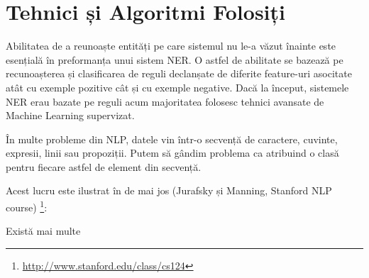 \chapter{Tehnici și Algoritmi Folosiți}

Abilitatea de a reunoaște entități pe care sistemul nu le-a văzut înainte este esențială în preformanța unui sistem NER. O astfel de abilitate se bazează pe recunoașterea și clasificarea de reguli declanșate de diferite feature-uri asocitate atât cu exemple pozitive cât și cu exemple negative. Dacă la început, sistemele NER erau bazate pe reguli acum majoritatea folosesc tehnici avansate de Machine Learning supervizat. 

În multe probleme din NLP, datele vin într-o secvență de caractere, cuvinte, expresii, linii sau propoziții. Putem să gândim problema ca atribuind o clasă pentru fiecare astfel de element din secvență.

Acest lucru este ilustrat în  de mai jos (Jurafsky și Manning, Stanford NLP course) \footnote{\url{http://www.stanford.edu/class/cs124}}:


Există mai multe 

